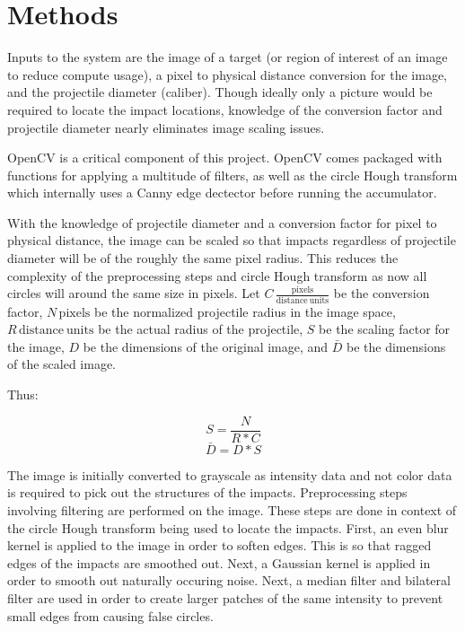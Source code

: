 \documentclass{article}
\newcommand{\unit}[1]{\ensuremath{\, \mathrm{#1}}}
\begin{document}
\section{Methods}
\label{sec:format}

Inputs to the system are the image of a target (or region of interest of an image to reduce
compute usage), a pixel to physical distance conversion for the image,
and the projectile diameter (caliber). Though ideally only a picture would
be required to locate the impact locations, knowledge of the conversion factor and projectile
diameter nearly eliminates image scaling issues.

OpenCV is a critical component of this project. OpenCV comes packaged with functions for
applying a multitude of filters, as well as the circle Hough transform which internally uses a
Canny edge dectector before running the accumulator.

With the knowledge of projectile diameter and a conversion factor for pixel to physical distance,
the image can be scaled so that impacts regardless of projectile diameter will be of the roughly
the same pixel radius. This reduces the complexity of the preprocessing steps and circle Hough
transform as now all circles will around the same size in pixels.
Let \(C \unit{\frac{pixels}{distance\ units}}\) be the conversion factor, \(N \unit{pixels}\)
be the normalized projectile radius in the image space, \(R \unit{distance\ units}\) be the 
actual radius of the projectile, \(S\) be the scaling factor for the image, \(D\) be 
the dimensions of the original image, and \(\bar{D}\) be the dimensions of the scaled image.

Thus:

\[S = \frac{N}{R * C}\]
\[\bar{D} = D * S\]

The image is initially converted to grayscale as intensity data and not color data is required
to pick out the structures of the impacts.
Preprocessing steps involving filtering are performed on the image. These steps are done
in context of the circle Hough transform being used to locate the impacts.
First, an even blur kernel is applied to the image in order to soften edges. This is so that
ragged edges of the impacts are smoothed out. Next, a Gaussian kernel is applied in order
to smooth out naturally occuring noise. Next, a median filter and bilateral filter are used in order
to create larger patches of the same intensity to prevent small edges from causing false circles.




\end{document}
